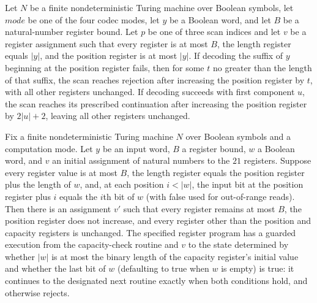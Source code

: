\begin{theorem}
\label{Complexity.Codec.pr_run}
\leanok
{}
Let $N$ be a finite nondeterministic Turing machine over Boolean symbols, let $mode$ be
one of the four codec modes, let $y$ be a Boolean word, and let $B$ be a natural-number
register bound. Let $p$ be one of three scan indices and let $v$ be a register
assignment such that every register is at most $B$, the length register equals $|y|$,
and the position register is at most $|y|$. If decoding the suffix of $y$ beginning at
the position register fails, then for some $t$ no greater than the length of that
suffix, the scan reaches rejection after increasing the position register by $t$, with
all other registers unchanged. If decoding succeeds with first component $u$, the scan
reaches its prescribed continuation after increasing the position register by $2|u|+2$,
leaving all other registers unchanged.
\end{theorem}

\begin{theorem}
\label{Complexity.Codec.ct_run}
\leanok
{}
Fix a finite nondeterministic Turing machine $N$ over Boolean symbols and a computation
mode. Let $y$ be an input word, $B$ a register bound, $w$ a Boolean word, and $v$ an
initial assignment of natural numbers to the $21$ registers. Suppose every register
value is at most $B$, the length register equals the position register plus the length
of $w$, and, at each position $i<|w|$, the input bit at the position register plus $i$
equals the $i$th bit of $w$ (with false used for out-of-range reads). Then there is an
assignment $v'$ such that every register remains at most $B$, the position register does
not increase, and every register other than the position and capacity registers is
unchanged. The specified register program has a guarded execution from the
capacity-check routine and $v$ to the state determined by whether $|w|$ is at most the
binary length of the capacity register's initial value and whether the last bit of $w$
(defaulting to true when $w$ is empty) is true: it continues to the designated next
routine exactly when both conditions hold, and otherwise rejects.
\end{theorem}

